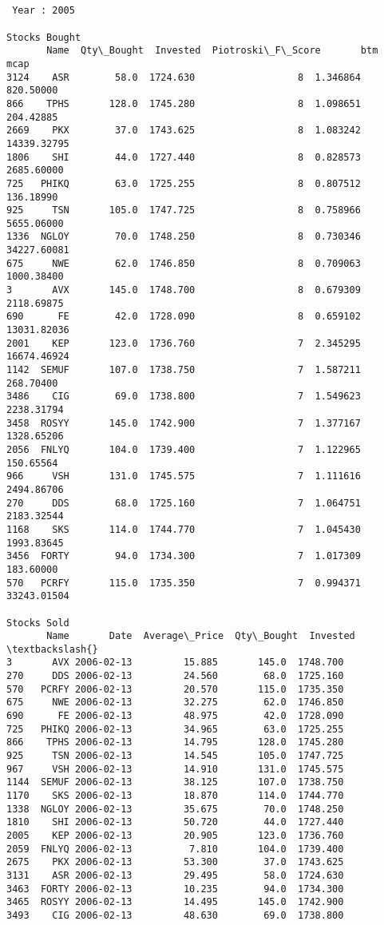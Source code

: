 \documentclass[11pt]{article}
\begin{document}
    \begin{Verbatim}[commandchars=\\\{\}]


 Year : 2005

Stocks Bought
       Name  Qty\_Bought  Invested  Piotroski\_F\_Score       btm         mcap
3124    ASR        58.0  1724.630                  8  1.346864    820.50000
866    TPHS       128.0  1745.280                  8  1.098651    204.42885
2669    PKX        37.0  1743.625                  8  1.083242  14339.32795
1806    SHI        44.0  1727.440                  8  0.828573   2685.60000
725   PHIKQ        63.0  1725.255                  8  0.807512    136.18990
925     TSN       105.0  1747.725                  8  0.758966   5655.06000
1336  NGLOY        70.0  1748.250                  8  0.730346  34227.60081
675     NWE        62.0  1746.850                  8  0.709063   1000.38400
3       AVX       145.0  1748.700                  8  0.679309   2118.69875
690      FE        42.0  1728.090                  8  0.659102  13031.82036
2001    KEP       123.0  1736.760                  7  2.345295  16674.46924
1142  SEMUF       107.0  1738.750                  7  1.587211    268.70400
3486    CIG        69.0  1738.800                  7  1.549623   2238.31794
3458  ROSYY       145.0  1742.900                  7  1.377167   1328.65206
2056  FNLYQ       104.0  1739.400                  7  1.122965    150.65564
966     VSH       131.0  1745.575                  7  1.111616   2494.86706
270     DDS        68.0  1725.160                  7  1.064751   2183.32544
1168    SKS       114.0  1744.770                  7  1.045430   1993.83645
3456  FORTY        94.0  1734.300                  7  1.017309    183.60000
570   PCRFY       115.0  1735.350                  7  0.994371  33243.01504

Stocks Sold
       Name       Date  Average\_Price  Qty\_Bought  Invested  \textbackslash{}
3       AVX 2006-02-13         15.885       145.0  1748.700
270     DDS 2006-02-13         24.560        68.0  1725.160
570   PCRFY 2006-02-13         20.570       115.0  1735.350
675     NWE 2006-02-13         32.275        62.0  1746.850
690      FE 2006-02-13         48.975        42.0  1728.090
725   PHIKQ 2006-02-13         34.965        63.0  1725.255
866    TPHS 2006-02-13         14.795       128.0  1745.280
925     TSN 2006-02-13         14.545       105.0  1747.725
967     VSH 2006-02-13         14.910       131.0  1745.575
1144  SEMUF 2006-02-13         38.125       107.0  1738.750
1170    SKS 2006-02-13         18.870       114.0  1744.770
1338  NGLOY 2006-02-13         35.675        70.0  1748.250
1810    SHI 2006-02-13         50.720        44.0  1727.440
2005    KEP 2006-02-13         20.905       123.0  1736.760
2059  FNLYQ 2006-02-13          7.810       104.0  1739.400
2675    PKX 2006-02-13         53.300        37.0  1743.625
3131    ASR 2006-02-13         29.495        58.0  1724.630
3463  FORTY 2006-02-13         10.235        94.0  1734.300
3465  ROSYY 2006-02-13         14.495       145.0  1742.900
3493    CIG 2006-02-13         48.630        69.0  1738.800


\end{Verbatim}
\end{document}

